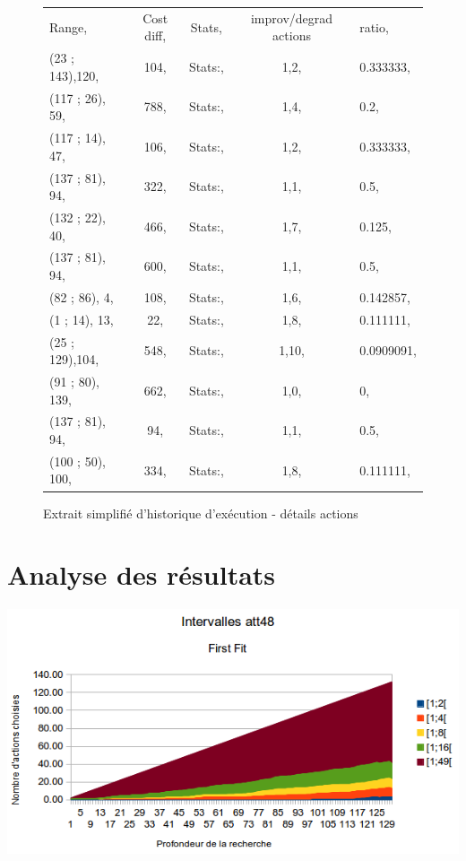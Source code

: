 \documentclass[a4paper,10pt]{report}
\begin{document}
\begin{figure}[h]
  \begin{tabular}{lcccl}
    Range,		&Cost diff,	
				&Stats,	&improv/degrad actions	&ratio,\\
    (23  ; 143),120,	&104,	&Stats:,	&1,2,		&0.333333,\\
    (117 ; 26),  59,	&788,	&Stats:,	&1,4,		&0.2,\\
    (117 ; 14),  47,	&106,	&Stats:,	&1,2,		&0.333333,\\
    (137 ; 81),  94,	&322,	&Stats:,	&1,1,		&0.5,\\
    (132 ; 22),  40,	&466,	&Stats:,	&1,7,		&0.125,\\
    (137 ; 81),  94,	&600,	&Stats:,	&1,1,		&0.5,\\
    (82  ; 86),   4,	&108,	&Stats:,	&1,6,		&0.142857,\\
    (1   ; 14),  13,	&22,	&Stats:,	&1,8,		&0.111111,\\
    (25  ; 129),104,	&548,	&Stats:,	&1,10,		&0.0909091,\\
    (91  ; 80), 139,	&662,	&Stats:,	&1,0,		&0,\\
    (137 ; 81),  94,	&94,	&Stats:,	&1,1,		&0.5,\\
    (100 ; 50), 100,	&334,	&Stats:,	&1,8,		&0.111111,\\
  \end{tabular}
  \label{a280-sample-interval-simple-bis}
  \caption{Extrait simplifié d'historique d'exécution - détails actions}
\end{figure}


\pagebreak
\section{Analyse des résultats}

\begin{center}
  \includegraphics[width=\textwidth]{images/att48-intervals-first-fit.png}
\end{center}
\end{document}
